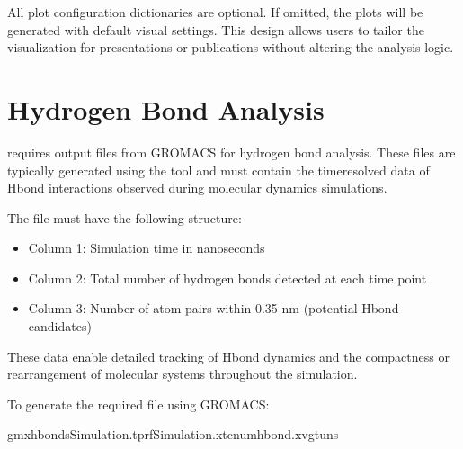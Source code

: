 \documentclass[a4paper,10pt,english]{sphinxmanual}
\begin{document}
\begin{sphinxVerbatim}[commandchars=\\\{\}]
 
\end{sphinxVerbatim}

\sphinxAtStartPar
All plot configuration dictionaries are optional. If omitted, the plots will be generated with default visual settings. This design allows users to tailor the visualization for presentations or publications without altering the analysis logic.


\section{Hydrogen Bond Analysis}
\label{\detokenize{Input:hydrogen-bond-analysis}}
\sphinxAtStartPar
{} requires  output files from GROMACS for hydrogen bond analysis. These files are typically generated using the  tool and must contain the time\sphinxhyphen{}resolved data of H\sphinxhyphen{}bond interactions observed during molecular dynamics simulations.

\sphinxAtStartPar
The  file must have the following structure:
\begin{itemize}
\item {} 
\sphinxAtStartPar
Column 1: Simulation time in nanoseconds

\item {} 
\sphinxAtStartPar
Column 2: Total number of hydrogen bonds detected at each time point

\item {} 
\sphinxAtStartPar
Column 3: Number of atom pairs within 0.35 nm (potential H\sphinxhyphen{}bond candidates)

\end{itemize}

\sphinxAtStartPar
These data enable detailed tracking of H\sphinxhyphen{}bond dynamics and the compactness or rearrangement of molecular systems throughout the simulation.

\sphinxAtStartPar
To generate the required  file using GROMACS:

\begin{sphinxVerbatim}[commandchars=\\\{\}]
gmxhbond\PYGZhy{}sSimulation.tpr\PYGZhy{}fSimulation.xtc\PYGZhy{}numhbond.xvg\PYGZhy{}tuns
\end{sphinxVerbatim}
\end{document}
